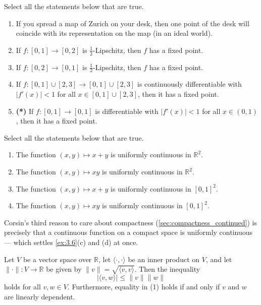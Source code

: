 \begin{exercise}
\label{ex:3.5}
Select all the statements below that are true.
\begin{enumerate}[label=\textbf{(\alph*)}]
  \item If you spread a map of Zurich on your desk, then one point of the desk will coincide with
    its representation on the map (in an ideal world).
  \item If $f : [0,1] \to [0,2]$ is $\tfrac{1}{2}$-Lipschitz, then $f$ has a fixed point.
  \item If $f : [0,2] \to [0,1]$ is $\tfrac{1}{2}$-Lipschitz, then $f$ has a fixed point.
  \item If $f : [0,1] \cup [2,3] \to [0,1] \cup [2,3]$ is continuously differentiable with
    $|f'(x)| < 1$ for all $x \in [0,1]\cup[2,3]$, then it has a fixed point.
  \item \textbf{(*)} If $f : [0,1] \to [0,1]$ is differentiable with $|f'(x)| < 1$ for all
    $x \in (0,1)$, then it has a fixed point.
\end{enumerate}
\end{exercise}

\begin{exercise}
\label{ex:3.6}
Select all the statements below that are true.
\begin{enumerate}[label=\textbf{(\alph*)}]
  \item The function $(x,y) \mapsto x+y$ is uniformly continuous in $\mathbb{R}^2$.
  \item The function $(x,y) \mapsto xy$ is uniformly continuous in $\mathbb{R}^2$.
  \item The function $(x,y) \mapsto x+y$ is uniformly continuous in $[0,1]^2$.
  \item The function $(x,y) \mapsto xy$ is uniformly continuous in $[0,1]^2$.
\end{enumerate}
\end{exercise}

\begin{remark}
Corsin's third reason to care about compactness (\cref{sec:compactness_continued}) is precisely
that a continuous function on a compact space is uniformly continuous --- which settles
\cref{ex:3.6}(c) and (d) at once.
\end{remark}

\begin{exercise}
\label{ex:3.7}
Let $V$ be a vector space over $\mathbb{R}$, let $\langle\cdot,\cdot\rangle$ be an inner product
on $V$, and let $\|\cdot\| : V \to \mathbb{R}$ be given by $\|v\| = \sqrt{\langle v,v\rangle}$.
Then the inequality
\begin{equation*}
|\langle v,w\rangle| \leq \|v\|\|w\| \tag{1}
\end{equation*}
holds for all $v, w \in V$. Furthermore, equality in (1) holds if and only if $v$ and $w$ are
linearly dependent.
\end{exercise}

